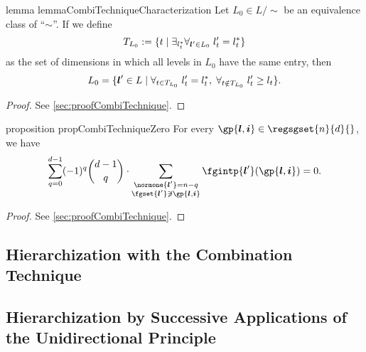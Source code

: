 \begin{restatable}{%
  lemma%
}{%
  lemmaCombiTechniqueCharacterization%
}
  \label{lemma:combiTechniqueCharacterization}
  Let $L_0 \in L/{\sim}$ be an equivalence class of ``$\sim$''.
  If we define
  \begin{equation}
    T_{L_0}
    := \{t \mid \exists_{l^\ast_t} \forall_{{\boldsymbol{l}}' \in L_0}\;l'_t = l^\ast_t\}
  \end{equation}
  as the set of dimensions in which all levels in $L_0$
  have the same entry, then
  \begin{equation}
    L_0
    = \{{\boldsymbol{l}}' \in L \mid
    \forall_{t \in T_{L_0}}\;l'_t = l^\ast_t,\;
    \forall_{t \notin T_{L_0}}\;l'_t \ge l_t\}.
  \end{equation}
\end{restatable}

\begin{proof}
  See \cref{sec:proofCombiTechnique}.
\end{proof}

\begin{restatable}{%
  proposition%
}{%
  propCombiTechniqueZero%
}
  \label{prop:combiTechniqueZero}
  For every $\gp{\*l,\*i} \in \regsgset{n}{d}{}$, we have
  \begin{equation}
    \sum_{q=0}^{d-1} (-1)^q \binom{d-1}{q} \cdot
    \sum_{\substack{\normone{\*l'} = n - q\\\fgset{\*l'} \notni \gp{\*l,\*i}}}
    \fgintp{\*l'}(\gp{\*l,\*i})
    = 0.
  \end{equation}
\end{restatable}

\begin{proof}
  See \cref{sec:proofCombiTechnique}.
\end{proof}

\blindtext{}



\subsection{Hierarchization with the Combination Technique}
\label{sec:432hierarchizationCombiTechnique}

\blindtext{}

\subsection{%
  Hierarchization by Successive Applications of the Unidirectional Principle%
}
\label{sec:433hierarchizationSuccessiveUP}

\blindtext{}
